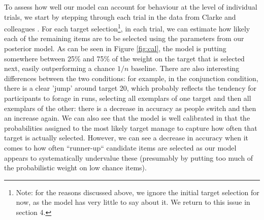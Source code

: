 \documentclass[preprints, article,submit,pdftex,moreauthors]{Definitions/mdpi}
\begin{document}
To assess how well our model can account for behaviour at the level of individual trials, we start by stepping through each trial in the data from Clarke and colleagues \cite{clarke2022}. For each target selection\footnote{Note: for the reasons discussed above, we ignore the initial target selection for now, as the model has very little to say about it. We return to this issue in section 4.}, in each trial, we can estimate how likely each of the remaining items are to be selected using the parameters from our posterior model. As can be seen in Figure \ref{fig:cal}, the model is putting somewhere between 25\% and 75\% of the weight on the target that is selected next, easily outperforming a chance $1/n$ baseline. There are also interesting differences between the two conditions: for example, in the conjunction condition, there is a clear 'jump' around target 20, which probably reflects the tendency for participants to forage in runs, selecting all exemplars of one target and then all exemplars of the other: there is a decrease in accuracy as people switch and then an increase again. We can also see that the model is well calibrated in that the probabilities assigned to the most likely target manage to capture how often that target is actually selected. However, we can see a decrease in accuracy when it comes to how often ``runner-up`` candidate items are selected as our model appears to systematically undervalue these (presumably by putting too much of the probabilistic weight on low chance items).
\end{document}

